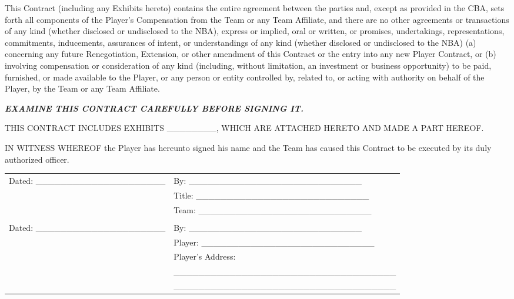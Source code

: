 \documentclass[
]{book}
\begin{document}
\begin{enumerate}
  This Contract (including any Exhibits hereto) contains the entire agreement between the parties and, except as provided in the CBA, sets forth all components of the Player's Compensation from the Team or any Team Affiliate, and there are no other agreements or transactions of any kind (whether disclosed or undisclosed to the NBA), express or implied, oral or written, or promises, undertakings, representations, commitments, inducements, assurances of intent, or understandings of any kind (whether disclosed or undisclosed to the NBA) (a) concerning any future Renegotiation, Extension, or other amendment of this Contract or the entry into any new Player Contract, or (b) involving compensation or consideration of any kind (including, without limitation, an investment or business opportunity) to be paid, furnished, or made available to the Player, or any person or entity controlled by, related to, or acting with authority on behalf of the Player, by the Team or any Team Affiliate.
\end{enumerate}

\newpage

\textbf{\emph{EXAMINE THIS CONTRACT CAREFULLY BEFORE SIGNING IT.}}

THIS CONTRACT INCLUDES EXHIBITS \_\_\_\_\_\_\_\_, WHICH ARE ATTACHED HERETO AND MADE A PART HEREOF.

IN WITNESS WHEREOF the Player has hereunto signed his name and the Team has caused this Contract to be executed by its duly authorized officer.

\begin{longtable}[]{@{}ll@{}}
\toprule()
\endhead
Dated: \_\_\_\_\_\_\_\_\_\_\_\_\_\_\_\_\_\_\_\_\_ & By: \_\_\_\_\_\_\_\_\_\_\_\_\_\_\_\_\_\_\_\_\_\_\_\_\_\_\_\_ \\
& Title: \_\_\_\_\_\_\_\_\_\_\_\_\_\_\_\_\_\_\_\_\_\_\_\_\_\_\_\_ \\
& Team: \_\_\_\_\_\_\_\_\_\_\_\_\_\_\_\_\_\_\_\_\_\_\_\_\_\_\_\_ \\
& \\
Dated: \_\_\_\_\_\_\_\_\_\_\_\_\_\_\_\_\_\_\_\_\_ & By: \_\_\_\_\_\_\_\_\_\_\_\_\_\_\_\_\_\_\_\_\_\_\_\_\_\_\_\_ \\
& Player: \_\_\_\_\_\_\_\_\_\_\_\_\_\_\_\_\_\_\_\_\_\_\_\_\_\_\_\_ \\
& Player's Address: \\
& \_\_\_\_\_\_\_\_\_\_\_\_\_\_\_\_\_\_\_\_\_\_\_\_\_\_\_\_\_\_\_\_\_\_\_\_ \\
& \_\_\_\_\_\_\_\_\_\_\_\_\_\_\_\_\_\_\_\_\_\_\_\_\_\_\_\_\_\_\_\_\_\_\_\_ \\
\bottomrule()
\end{longtable}
\end{document}
